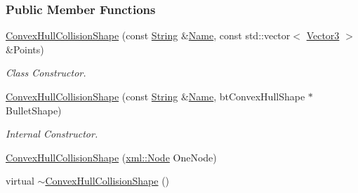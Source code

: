 \subsubsection*{Public Member Functions}
\begin{DoxyCompactItemize}
\item 
\hyperlink{classMezzanine_1_1ConvexHullCollisionShape_a73119a35d5ba1e5cfebde7d58f894889}{ConvexHullCollisionShape} (const \hyperlink{namespaceMezzanine_acf9fcc130e6ebf08e3d8491aebcf1c86}{String} \&\hyperlink{classMezzanine_1_1CollisionShape_aac524c5c56fa4d158bc071f8aecfbe79}{Name}, const std::vector$<$ \hyperlink{classMezzanine_1_1Vector3}{Vector3} $>$ \&Points)
\begin{DoxyCompactList}\small\item\em Class Constructor. \item\end{DoxyCompactList}\item 
\hyperlink{classMezzanine_1_1ConvexHullCollisionShape_a100c6b3009ad46976a0484446a3d5da2}{ConvexHullCollisionShape} (const \hyperlink{namespaceMezzanine_acf9fcc130e6ebf08e3d8491aebcf1c86}{String} \&\hyperlink{classMezzanine_1_1CollisionShape_aac524c5c56fa4d158bc071f8aecfbe79}{Name}, btConvexHullShape $\ast$BulletShape)
\begin{DoxyCompactList}\small\item\em Internal Constructor. \item\end{DoxyCompactList}\item 
\hyperlink{classMezzanine_1_1ConvexHullCollisionShape_ae2b4a603258a2da06a56f8521673affa}{ConvexHullCollisionShape} (\hyperlink{classMezzanine_1_1xml_1_1Node}{xml::Node} OneNode)
\item 
\hypertarget{classMezzanine_1_1ConvexHullCollisionShape_ae6c30c38604747a2d2500b25d88de50e}{
virtual \hyperlink{classMezzanine_1_1ConvexHullCollisionShape_ae6c30c38604747a2d2500b25d88de50e}{$\sim$ConvexHullCollisionShape} ()}
\label{classMezzanine_1_1ConvexHullCollisionShape_ae6c30c38604747a2d2500b25d88de50e}


\end{DoxyCompactItemize}
